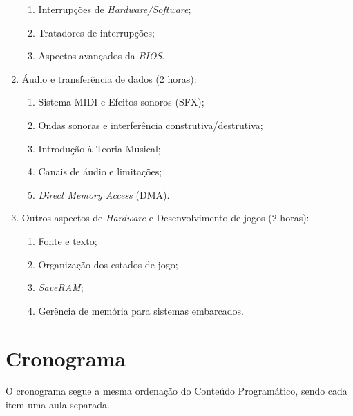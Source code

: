 \documentclass{article}
\begin{document}
\begin{enumerate}
\begin{samepage}
\begin{enumerate}
                \item Interrupções de \textit{Hardware/Software};
                \item Tratadores de interrupções;
                \item Aspectos avançados da \textit{BIOS}.
        \end{enumerate}
        \end{samepage}
    \item Áudio e transferência de dados (2 horas):
        \begin{samepage}
        \begin{enumerate}
                \item Sistema MIDI e Efeitos sonoros (SFX);
                \item Ondas sonoras e interferência construtiva/destrutiva;
                \item Introdução à Teoria Musical;
                \item Canais de áudio e limitações;
                \item \textit{Direct Memory Access} (DMA).
        \end{enumerate}
        \end{samepage}
    \item Outros aspectos de \textit{Hardware} e Desenvolvimento de jogos (2 horas):
        \begin{samepage}
        \begin{enumerate}
                \item Fonte e texto;
                \item Organização dos estados de jogo;
                \item \textit{SaveRAM};
                \item Gerência de memória para sistemas embarcados.
        \end{enumerate}
        \end{samepage}
\end{enumerate}

\section{Cronograma}

O cronograma segue a mesma ordenação do Conteúdo Programático, sendo cada item
uma aula separada.

\nocite{*}


\end{document}
